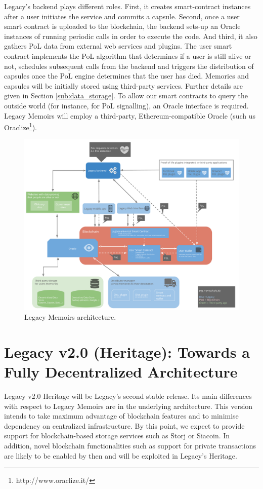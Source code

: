 Legacy’s backend plays different roles. First, it creates smart-contract instances after a user initiates the service and commits a capsule. Second, once a user smart contract is uploaded to the blockchain, the backend sets-up an Oracle instances of running periodic calls in order to execute the code. And third, it also gathers PoL data from external web services and plugins. The user smart contract implements the PoL algorithm that determines if a user is still alive or not, schedules subsequent calls from the backend and triggers the distribution of capsules once the PoL engine determines that the user has died. 
Memories and capsules will be initially stored using third-party services. Further details are given in Section \ref{sub:data_storage}.
To allow our smart contracts to query the outside world (for instance, for PoL signalling), an Oracle interface is required. Legacy Memoirs will employ a third-party, Ethereum-compatible Oracle (such us Oraclize\footnote{http://www.oraclize.it/}).

\begin{figure}[h]
  \centering
  \includegraphics[scale=0.3]{fig/architecture_v02_hybrid}
  \caption{Legacy Memoirs architecture.}
  \label{fig:leg_v1_arch}
\end{figure} 


\section{Legacy v2.0 (Heritage): Towards a Fully Decentralized Architecture} %
\label{sec:legacy_v2_0_heritage_towards_a_fully_decentralized_architecture}
Legacy v2.0 Heritage will be Legacy’s second stable release. Its main differences with respect to Legacy Memoirs are in the underlying architecture. This version intends to take maximum advantage of blockchain features and to minimise dependency on centralized infrastructure.
By this point, we expect to provide support for blockchain-based storage services such as Storj or Siacoin.
In addition, novel blockchain functionalities such as support for private transactions are likely to be enabled by then and will be exploited in Legacy's Heritage. 


